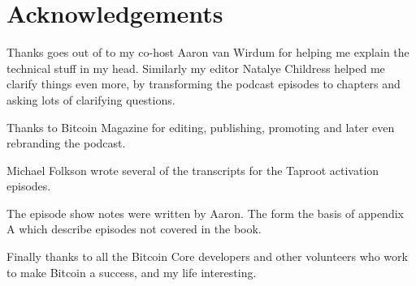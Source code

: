 \chapter{Acknowledgements}

Thanks goes out of to my co-host Aaron van Wirdum for helping me explain the technical stuff in my head. Similarly my editor Natalye Childress helped me clarify things even more, by transforming the podcast episodes to chapters and asking lots of clarifying questions.

Thanks to Bitcoin Magazine for editing, publishing, promoting and later even rebranding the podcast.

Michael Folkson wrote several of the transcripts for the Taproot activation episodes.

The episode show notes were written by Aaron. The form the basis of appendix A which describe episodes not covered in the book.

Finally thanks to all the Bitcoin Core developers and other volunteers who work to make Bitcoin a success, and my life interesting.
